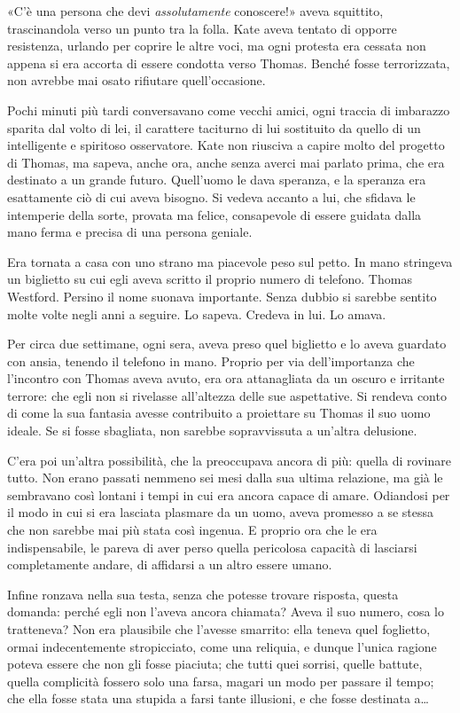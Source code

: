 \documentclass[a4paper,oneside,11pt]{memoir}
\begin{document}
«C'è una persona che devi \emph{assolutamente} conoscere!» aveva squittito,
trascinandola verso un punto tra la folla. Kate aveva tentato di opporre
resistenza, urlando per coprire le altre voci, ma ogni protesta era cessata non
appena si era accorta di essere condotta verso Thomas. Benché fosse
terrorizzata, non avrebbe mai osato rifiutare quell'occasione.

Pochi minuti più tardi conversavano come vecchi amici, ogni traccia di imbarazzo
sparita dal volto di lei, il carattere taciturno di lui sostituito da quello di
un intelligente e spiritoso osservatore. Kate non riusciva a capire molto del
progetto di Thomas, ma sapeva, anche ora, anche senza averci mai parlato prima,
che era destinato a un grande futuro. Quell'uomo le dava speranza, e la speranza
era esattamente ciò di cui aveva bisogno. Si vedeva accanto a lui, che sfidava
le intemperie della sorte, provata ma felice, consapevole di essere guidata
dalla mano ferma e precisa di una persona geniale.

Era tornata a casa con uno strano ma piacevole peso sul petto. In mano stringeva
un biglietto su cui egli aveva scritto il proprio numero di telefono. Thomas
Westford. Persino il nome suonava importante. Senza dubbio si sarebbe sentito
molte volte negli anni a seguire. Lo sapeva. Credeva in lui. Lo amava.

Per circa due settimane, ogni sera, aveva preso quel biglietto e lo aveva
guardato con ansia, tenendo il telefono in mano. Proprio per via dell'importanza
che l'incontro con Thomas aveva avuto, era ora attanagliata da un oscuro e
irritante terrore: che egli non si rivelasse all'altezza delle sue aspettative.
Si rendeva conto di come la sua fantasia avesse contribuito a proiettare su
Thomas il suo uomo ideale. Se si fosse sbagliata, non sarebbe sopravvissuta a
un'altra delusione.

C'era poi un'altra possibilità, che la preoccupava ancora di più: quella di
rovinare tutto. Non erano passati nemmeno sei mesi dalla sua ultima relazione,
ma già le sembravano così lontani i tempi in cui era ancora capace di amare.
Odiandosi per il modo in cui si era lasciata plasmare da un uomo, aveva promesso
a se stessa che non sarebbe mai più stata così ingenua. E proprio ora che le era
indispensabile, le pareva di aver perso quella pericolosa capacità di lasciarsi
completamente andare, di affidarsi a un altro essere umano.

Infine ronzava nella sua testa, senza che potesse trovare risposta, questa
domanda: perché egli non l'aveva ancora chiamata? Aveva il suo numero, cosa lo
tratteneva? Non era plausibile che l'avesse smarrito: ella teneva quel
foglietto, ormai indecentemente stropicciato, come una reliquia, e dunque
l'unica ragione poteva essere che non gli fosse piaciuta; che tutti quei
sorrisi, quelle battute, quella complicità fossero solo una farsa, magari un
modo per passare il tempo; che ella fosse stata una stupida a farsi tante
illusioni, e che fosse destinata a\dots
\end{document}
